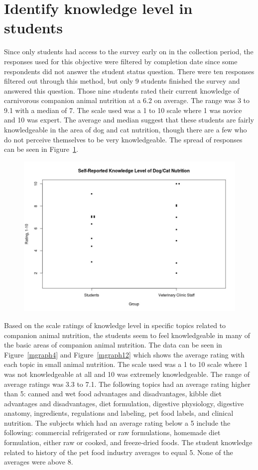 \section{Identify knowledge level in students}
Since only students had access to the survey early on in the collection period, the responses used for this objective were filtered by completion date since some respondents did not answer the student status question. There were ten responses filtered out through this method, but only 9 students finished the survey and answered this question. Those nine students rated their current knowledge of carnivorous companion animal nutrition at a 6.2 on average. The range was 3 to 9.1 with a median of 7. The scale used was a 1 to 10 scale where 1 was novice and 10 was expert. The average and median suggest that these students are fairly knowledgeable in the area of dog and cat nutrition, though there are a few who do not perceive themselves to be very knowledgeable. The spread of responses can be seen in Figure~\ref{mgraph3}.
    \begin{figure}[htbp] \centering
    \includegraphics[width=1.0\textwidth]{Images/srkl.jpeg}
    \label{mgraph3}
    \end{figure}
\par Based on the scale ratings of knowledge level in specific topics related to companion animal nutrition, the students seem to feel knowledgeable in many of the basic areas of companion animal nutrition. The data can be seen in Figure~\ref{mgraph4} and Figure~\ref{mgraph12} which shows the average rating with each topic in small animal nutrition. The scale used was a 1 to 10 scale where 1 was not knowledgeable at all and 10 was extremely knowledgeable. The range of average ratings was 3.3 to 7.1. The following topics had an average rating higher than 5: canned and wet food advantages and disadvantages, kibble diet advantages and disadvantages, diet formulation, digestive physiology, digestive anatomy, ingredients, regulations and labeling, pet food labels, and clinical nutrition. The subjects which had an average rating below a 5 include the following: commercial refrigerated or raw formulations, homemade diet formulation, either raw or cooked, and freeze-dried foods. The student knowledge related to history of the pet food industry averages to equal 5. None of the averages were above 8.

